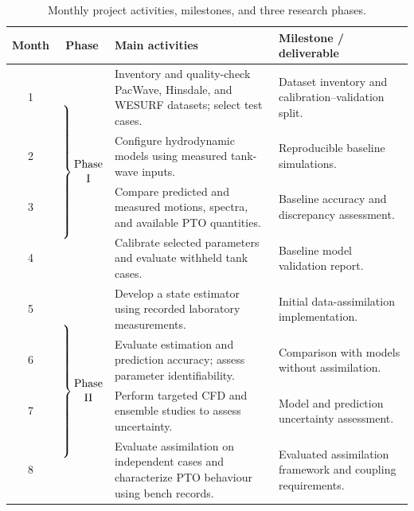 \documentclass[11pt]{article}
\begin{document}
\begin{table}[t!]
\centering
\caption{Monthly project activities, milestones, and three research phases.}
\label{tab:project_work_plan}
\small
\renewcommand{\arraystretch}{1.25}

\newcommand{\phasebrace}[1]{%
  $\left.\rule[-2.1cm]{0pt}{4.2cm}\right\}
  \begin{gathered}
    \text{Phase}\\[-2pt]
    \text{#1}
  \end{gathered}$%
}

\begin{tabularx}{\textwidth}{
    @{} c c
    >{\raggedright\arraybackslash}X
    >{\raggedright\arraybackslash}X @{}
}
\toprule
\textbf{Month} & \textbf{Phase} & \textbf{Main activities}
& \textbf{Milestone / deliverable} \\
\midrule

1 & \multirow{4}{*}{\phasebrace{I}}
& Inventory and quality-check PacWave, Hinsdale, and WESURF
datasets; select test cases.
& Dataset inventory and calibration--validation split. \\

2 &
& Configure hydrodynamic models using measured tank-wave inputs.
& Reproducible baseline simulations. \\

3 &
& Compare predicted and measured motions, spectra, and
available PTO quantities.
& Baseline accuracy and discrepancy assessment. \\

4 &
& Calibrate selected parameters and evaluate withheld tank cases.
& Baseline model validation report. \\

\midrule

5 & \multirow{4}{*}{\phasebrace{II}}
& Develop a state estimator using recorded laboratory measurements.
& Initial data-assimilation implementation. \\

6 &
& Evaluate estimation and prediction accuracy; assess
parameter identifiability.
& Comparison with models without assimilation. \\

7 &
& Perform targeted CFD and ensemble studies to assess uncertainty.
& Model and prediction uncertainty assessment. \\

8 &
& Evaluate assimilation on independent cases and characterize
PTO behaviour using bench records.
& Evaluated assimilation framework and coupling requirements. \\


\end{tabularx}
\end{table}
\end{document}
